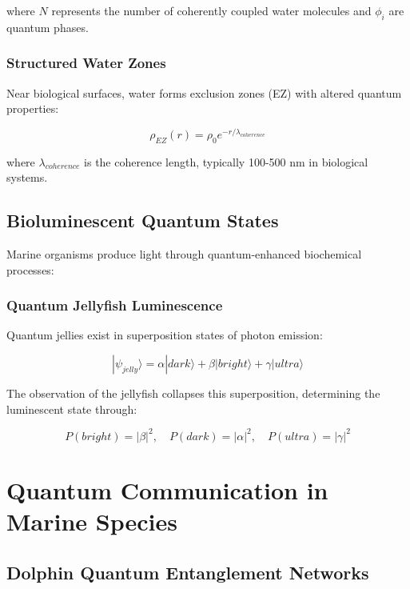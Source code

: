 \documentclass[11pt,a4paper]{article}
\begin{document}
where $N$ represents the number of coherently coupled water molecules and $\phi_i$ are quantum phases.

\subsubsection{Structured Water Zones}

Near biological surfaces, water forms exclusion zones (EZ) with altered quantum properties:

\begin{equation}
\rho_{EZ}(r) = \rho_0 e^{-r/\lambda_{coherence}}
\end{equation}

where $\lambda_{coherence}$ is the coherence length, typically 100-500 nm in biological systems.

\subsection{Bioluminescent Quantum States}

Marine organisms produce light through quantum-enhanced biochemical processes:

\subsubsection{Quantum Jellyfish Luminescence}

Quantum jellies exist in superposition states of photon emission:

\begin{equation}
|\psi_{jelly}\rangle = \alpha|dark\rangle + \beta|bright\rangle + \gamma|ultra\rangle
\end{equation}

The observation of the jellyfish collapses this superposition, determining the luminescent state through:

\begin{equation}
P(bright) = |\beta|^2, \quad P(dark) = |\alpha|^2, \quad P(ultra) = |\gamma|^2
\end{equation}

\section{Quantum Communication in Marine Species}

\subsection{Dolphin Quantum Entanglement Networks}
\end{document}
